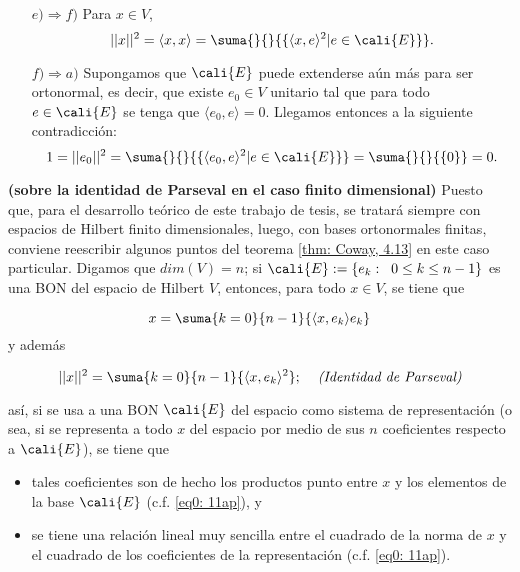\begin{itemize}
\item[$e) \Rightarrow f)$] Para $x \in V$,
\[
||x||^{2}=\langle x,x \rangle = \suma{}{}{\{
\langle x,e\rangle ^{2}| e \in \cali{E} \}}.
\]

\item[$f) \Rightarrow a)$]
Supongamos que $\cali{E}$ puede extenderse aún más
para ser ortonormal, es decir, que existe 
$e_{0} \in V$ unitario tal que
para todo $e \in \cali{E}$ se tenga que 
$\langle e_{0}, e \rangle=0$. 
Llegamos entonces a la siguiente contradicción:
\[
1=||e_{0}||^{2}=\suma{}{}{\{ 
\langle e_{0}, e \rangle^{2}| e \in \cali{E} \}}=
\suma{}{}{\{ 0\}}=0.
\]
\QEDB
\end{itemize}
\vspace{0.2cm}


\begin{nota}
\label{nota: sobre la identidad de parseval}
\textbf{(sobre la identidad de Parseval en el
caso finito dimensional)}
Puesto que, para el desarrollo teórico de este trabajo de tesis,
se tratará siempre con espacios de Hilbert finito dimensionales, luego, con
bases ortonormales finitas, conviene
reescribir algunos puntos del teorema 
\ref{thm: Coway, 4.13} en este caso particular.
Digamos que $dim(V)=n$; si 
$\cali{E} := \{e_{k}: \hspace{0.2cm} 0 \leq k \leq n-1 \}$ es una
BON del espacio de Hilbert $V$, entonces, para todo
$x \in V$, se tiene que 

\begin{equation}
\label{eq0: 11ap}
x = \suma{k=0}{n-1}{\langle x , e_{k} \rangle e_{k}}
\end{equation}
y además

\begin{equation}
\label{eq1: 11ap}
|| x ||^{2} = \suma{k=0}{n-1}{\langle x , e_{k} \rangle^{2}};
\hspace{0.4cm} \textit{(Identidad de Parseval)}
\end{equation}


\noindent
así, si se usa a una BON $\cali{E}$ del espacio como sistema
de representación (o sea, si se representa a todo $x$ del espacio 
por medio de sus $n$ coeficientes respecto a $\cali{E}$), se tiene que
\begin{itemize}
	\item tales coeficientes son de hecho los productos punto entre
	$x$ y los elementos de la base $\cali{E}$ (c.f. 
	\eqref{eq0: 11ap}), y
	\item se tiene una relación lineal muy sencilla entre el cuadrado
	de la norma de $x$ y el cuadrado de los coeficientes de la representación
	(c.f. \eqref{eq0: 11ap}).
\end{itemize}


\end{nota}
